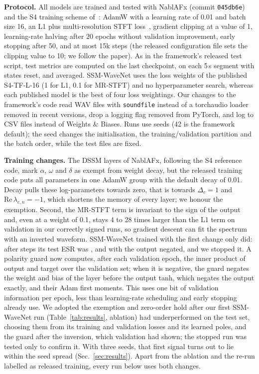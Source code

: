 \documentclass{article}
\begin{document}
\textbf{Protocol.} All models are trained and tested with NablAFx (commit
\texttt{045db6e}) and the S4 training scheme of~\cite{comunita2025frontiers}:
AdamW with a learning rate of 0.01 and batch size 16, an L1 plus
multi-resolution STFT loss~\cite{steinmetz2020auraloss, yamamoto2020pwg},
gradient clipping at a value of 1, learning-rate halving after 20 epochs without
validation improvement, early stopping after 50, and at most 15k steps (the
released configuration file sets the clipping value to 10; we follow the
paper). As in the framework's released test script, test metrics are computed
on the last checkpoint, on each 5\,s segment with states reset, and averaged.
SSM-WaveNet uses the loss weights of the published S4-TF-L-16 (1 for L1, 0.1
for MR-STFT) and no hyperparameter search, whereas each published model is the
best of four loss weightings. Our changes to the framework's code read WAV files
with \texttt{soundfile} instead of a torchaudio loader removed in recent
versions, drop a logging flag removed from PyTorch, and log to CSV files
instead of Weights \& Biases. Runs use seeds \SeedList{} (42 is the framework
default); the seed changes the initialisation, the training/validation partition
and the batch order, while the test files are fixed.

\textbf{Training changes.} The DSSM layers of NablAFx, following the S4
reference code, mark $\alpha$, $\omega$ and $\delta$ as exempt from weight
decay, but the released training code puts all parameters in one AdamW group
with the default decay of 0.01. Decay pulls these log-parameters towards zero,
that is towards $\Delta_c = 1$ and $\mathrm{Re}\,\lambda_{c,n} = -1$, which
shortens the memory of every layer; we honour the exemption. Second, the
MR-STFT term is invariant to the sign of the output and, even at a weight of
0.1, stays 4 to 28 times larger than the L1 term on validation in our correctly
signed runs, so gradient descent can fit the spectrum with an inverted waveform.
SSM-WaveNet trained with the first change only did: after
\InvertedStep{} steps its test ESR was \InvertedEsr, and \InvertedNegatedEsr{}
with the output negated, and we stopped it. A polarity guard now computes, after
each validation epoch, the inner product of output and target over the
validation set; when it is negative, the guard negates the weight and bias of
the layer before the output tanh, which negates the output exactly, and their
Adam first moments. This uses one bit of validation information per epoch, less
than learning-rate scheduling and early stopping already use. We adopted the
exemption and zero-order hold after our first SSM-WaveNet run
(Table~\ref{tab:results}, ablation) had underperformed on the test set, choosing
them from its training and validation losses and its learned poles, and the
guard after the inversion, which validation had shown; the stopped run was
tested only to confirm it. With three seeds, that first signal turns out to lie
within the seed spread (Sec.~\ref{sec:results}). Apart from the ablation and the
re-run labelled as released training, every run below uses both changes.
\end{document}
